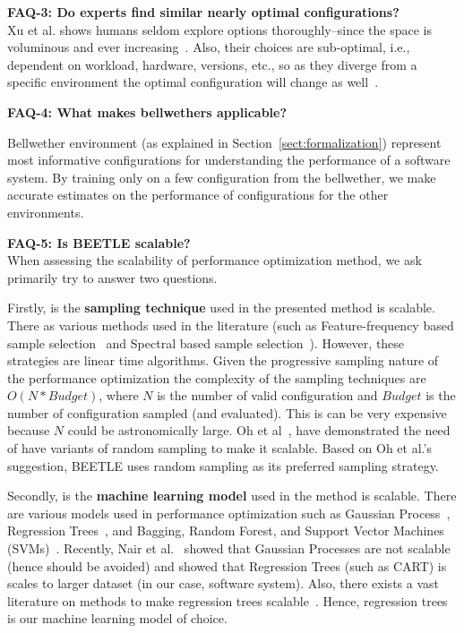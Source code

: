 \documentclass[10pt,journal,compsoc]{IEEEtran}
\begin{document}
\noindent\textbf{FAQ-3: Do experts  find similar nearly optimal configurations?}\\
Xu et al. shows humans seldom explore options thoroughly--since the space is voluminous and ever increasing~\cite{xu2015hey}. Also, their choices are sub-optimal, i.e., dependent on workload, hardware, versions, etc., so as they diverge from a specific environment the optimal configuration will change as well~\cite{JC:MASCOTS16, jamshidi2017transfer}.

\noindent\textbf{FAQ-4: What makes bellwethers applicable?}

\noindent Bellwether environment (as explained in Section~\ref{sect:formalization}) represent most informative configurations for understanding the performance of a software system. By training only on a few configuration from the bellwether, we make accurate estimates on the performance of configurations for the other environments.

\noindent \textbf{FAQ-5: Is BEETLE scalable?}\\
\noindent When assessing the scalability of performance optimization method, we ask primarily try to answer two questions. 

Firstly, is the \textbf{sampling technique} used in the presented method is scalable. There as various methods used in the literature (such as Feature-frequency based sample selection~\cite{sarkar2015cost} and Spectral based sample selection~\cite{nair2017faster, }). However, these strategies are linear time algorithms. Given the progressive sampling nature of the performance optimization the complexity of the sampling techniques are $O(N*Budget)$, where $N$ is the number of valid configuration and $Budget$ is the number of configuration sampled (and evaluated). This is can be very expensive because $N$ could be astronomically large.  Oh et al~\cite{oh2017finding}, have demonstrated the need of have variants of random sampling to make it scalable. Based on Oh et al.'s suggestion, BEETLE uses random sampling as its preferred sampling strategy.

Secondly, is the \textbf{machine learning model} used in the method is scalable. There are various models used in performance optimization such as Gaussian Process~\cite{jamshidi2017transfer}, Regression Trees~\cite{guo2013variability, sarkar2015cost, nair2018finding}, and Bagging, Random Forest, and Support
Vector Machines (SVMs)~\cite{valov2015empirical}. Recently, Nair et al.~\cite{nair2018finding} showed that Gaussian Processes are not scalable (hence should be avoided) and showed that Regression Trees (such as CART) is scales to larger dataset (in our case, software system). Also, there exists a vast literature on methods to make regression trees scalable~\cite{domingos2000mining}. Hence, regression trees is our machine learning model of choice.
 
\end{document}
